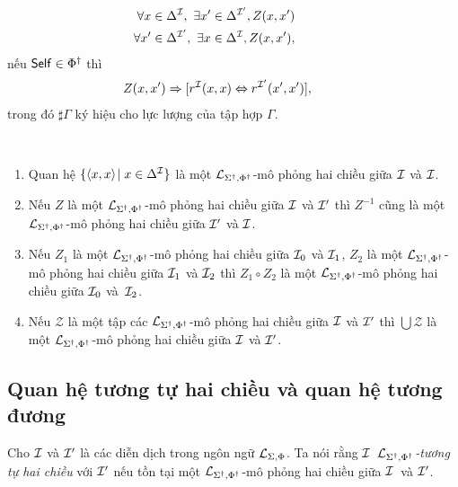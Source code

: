 \begin{Definition}
\begin{eqnarray}
		&&\!\!\!\!\!\!\!\!\!\!\!\!\!\!\!\!\!\!\!\!\!\!\!\! 
		\V x \in \Delta^\mI,\ \E x' \in \Delta^{\mI'}, Z(x,x') \label{bs:eqU1} \\
		&&\!\!\!\!\!\!\!\!\!\!\!\!\!\!\!\!\!\!\!\!\!\!\!\! 
		\V x' \in \Delta^{\mI'},\ \E x \in \Delta^\mI, Z(x,x'), \label{bs:eqU2}
	\end{eqnarray}
	nếu $\mathsf{Self} \in \Phi^\dag$ thì
	\begin{eqnarray}
		&&\!\!\!\!\!\!\!\!\!\!\!\!\!\!\!\!\!\!\!\!\!
		Z(x,x') \Rightarrow [r^\mI(x,x) \Leftrightarrow r^{\mI'}(x',x')], \label{bs:eqSelf}
	\end{eqnarray}
	trong đó $\sharp\Gamma$ ký hiệu cho lực lượng của tập hợp $\Gamma$.\myend
\end{Definition}

\begin{Lemma}
\label{lm:Bisimulation}~
	\begin{enumerate}
		\item Quan hệ $\{\left\langle x,x\right\rangle\! \mid x \in \Delta^{\mathcal{I}}\}$ là một $\mathcal{L}_{\Sigma^\dag,\Phi^\dag}$-mô phỏng hai chiều giữa $\mathcal{I}$ và $\mathcal{I}$.\label{lm:item1}
		\item Nếu $Z$ là một $\mathcal{L}_{\Sigma^\dag,\Phi^\dag}$-mô phỏng hai chiều giữa $\mathcal{I}$ và $\mathcal{I}'$ thì $Z^{-1}$ cũng là một $\mathcal{L}_{\Sigma^\dag,\Phi^\dag}$-mô phỏng hai chiều giữa $\mathcal{I}'$ và $\mathcal{I}$.\label{lm:item2}
		\item Nếu $Z_1$ là một $\mathcal{L}_{\Sigma^\dag,\Phi^\dag}$-mô phỏng hai chiều giữa $\mathcal{I}_0$ và $\mathcal{I}_1$, $Z_2$ là một $\mathcal{L}_{\Sigma^\dag,\Phi^\dag}$-mô phỏng hai chiều giữa $\mathcal{I}_1$ và $\mathcal{I}_2$ thì $Z_1 \circ Z_2$ là một $\mathcal{L}_{\Sigma^\dag,\Phi^\dag}$-mô phỏng hai chiều giữa $\mathcal{I}_0$ và~$\mathcal{I}_2$.\label{lm:item3}
		\item Nếu $\mathcal{Z}$ là một tập các $\mathcal{L}_{\Sigma^\dag,\Phi^\dag}$-mô phỏng hai chiều giữa $\mathcal{I}$ và $\mathcal{I}'$ thì $\bigcup \mathcal{Z}$ là một $\mathcal{L}_{\Sigma^\dag,\Phi^\dag}$-mô phỏng hai chiều giữa $\mathcal{I}$ và $\mathcal{I}'$.\label{lm:item4}\myend
	\end{enumerate}
\end{Lemma}

\subsection{Quan hệ tương tự hai chiều và quan hệ tương đương}
\label{sec:Chap2.Bisimilary}

\begin{Definition}
\label{def:InterpretationBisimilarity}
	Cho $\mathcal{I}$ và $\mathcal{I}'$ là các diễn dịch trong ngôn ngữ $\mathcal{L}_{\Sigma,\Phi}$. Ta nói rằng $\mathcal{I}$~{\em $\mathcal{L}_{\Sigma^\dag,\Phi^\dag}$-tương tự hai chiều} với $\mathcal{I}'$ nếu tồn tại một $\mathcal{L}_{\Sigma^\dag,\Phi^\dag}$-mô phỏng hai chiều giữa $\mathcal{I}$~và $\mathcal{I}'$.\myend
\end{Definition}

